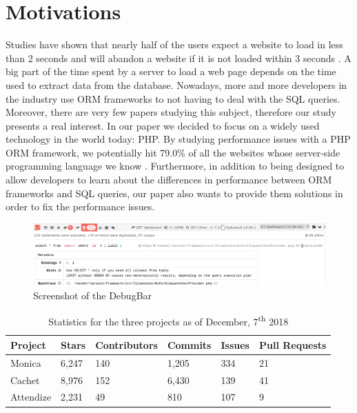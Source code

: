 \documentclass[sigconf]{acmart}
\begin{document}
\section{Motivations}
Studies have shown that nearly half of the users expect a website to load in less than 2 seconds and will abandon a website if it is not loaded within 3 seconds \cite{siteleave}. A big part of the time spent by a server to load a web page depends on the time used to extract data from the database. Nowadays, more and more developers in the industry use ORM frameworks to not having to deal with the SQL queries. Moreover, there are very few papers studying this subject, therefore our study presents a real interest. In our paper we decided to focus on a widely used technology in the world today: PHP. By studying performance issues with a PHP ORM framework, we potentially hit 79.0\% of all the websites whose server-side programming language we know \cite{w3tech}. Furthermore, in addition to being designed to allow developers to learn about the differences in performance between ORM frameworks and SQL queries, our paper also wants to provide them solutions in order to fix the performance issues.

\begin{figure}[ht!]
\includegraphics[width=\textwidth]{debugbar2}
\caption{Screenshot of the DebugBar}
\label{debugbar}
\end{figure}
\begin{table}[ht!]
\begin{tabular}{|l|l|l|l|l|l|}
\hline
\textbf{Project} & \textbf{Stars} & \textbf{Contributors} & \textbf{Commits} & \textbf{Issues} & \textbf{Pull Requests} \\ \hline
Monica           & 6,247                    & 140                             & 1,205                      & 334                       & 21                               \\ \hline
Cachet           & 8,976                    & 152                             & 6,430                      & 139                       & 41                               \\ \hline
Attendize        & 2,231                    & 49                              & 810                        & 107                       & 9                                \\ \hline
\end{tabular}
\caption{Statistics for the three projects as of December, 7\textsuperscript{th} 2018}
\label{statistics}
\end{table}
\end{document}
